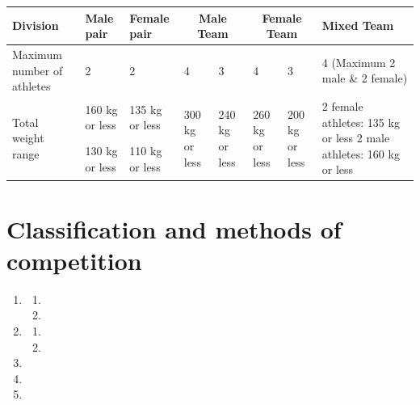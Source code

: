 \documentclass[draft]{report}
\begin{document}
\begin{enumerate}
\begin{center}
\begin{tabular}{ |m{5em}|m{6em}|m{6em}|m{6em}|m{6em}|m{6em}|m{6em}|m{10em}|  } 
 \hline
 Division & Male pair & Female pair & \multicolumn{2}{|c|}{Male Team} & \multicolumn{2}{|c|}{Female Team} & Mixed Team \\
 \hline
 Maximum \newline number of \newline athletes & 2 & 2 & 4 & 3 & 4 & 3 & 4 (Maximum 2 male \& 2 female) \\
 \hline                                                                                        
 \multirow{2}{6em}{Total weight range} & 160 kg or less & 135 kg or less & \multirow{2}{5em}{300 kg or less} & \multirow{2}{5em}{240 kg or less} & \multirow{2}{5em}{260 kg or less} & \multirow{2}{5em}{200 kg or less} & \multirow{2}{10em}{2 female athletes: 135 kg or less 2 male athletes: 160 kg or less} \\
 \cline{2-3}
 & 130 kg or less & 110 kg or less & & & & & \\
 \hline                                                                                        
\end{tabular}
\end{center}

\end{enumerate}


\chapter{Classification and methods of competition}\label{classification-and-methods-of-competition}

\begin{enumerate}

\item


  \begin{enumerate}
  \item
  
  \item
  
  \end{enumerate}

\item


  \begin{enumerate}
  \item
  
  \item
  
  \end{enumerate}

\item

\item

\item

\end{enumerate}
\end{document}
